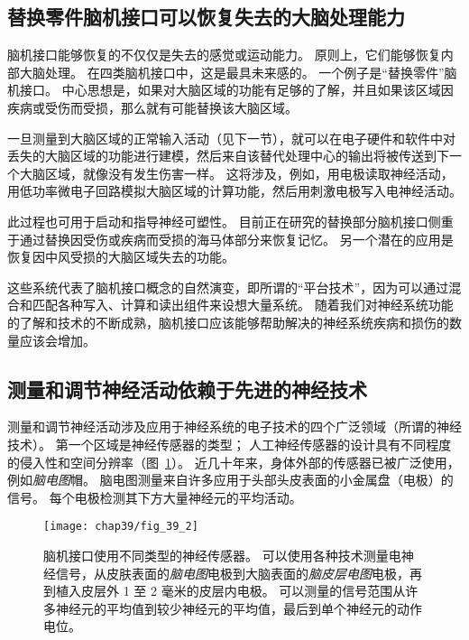 \subsection{替换零件脑机接口可以恢复失去的大脑处理能力}

脑机接口能够恢复的不仅仅是失去的感觉或运动能力。
原则上，它们能够恢复内部大脑处理。
在四类脑机接口中，这是最具未来感的。
一个例子是“替换零件”脑机接口。
中心思想是，如果对大脑区域的功能有足够的了解，并且如果该区域因疾病或受伤而受损，那么就有可能替换该大脑区域。


一旦测量到大脑区域的正常输入活动（见下一节），就可以在电子硬件和软件中对丢失的大脑区域的功能进行建模，然后来自该替代处理中心的输出将被传送到下一个大脑区域，就像没有发生伤害一样。
这将涉及，例如，用电极读取神经活动，用低功率微电子回路模拟大脑区域的计算功能，然后用刺激电极写入电神经活动。


此过程也可用于启动和指导神经可塑性。
目前正在研究的替换部分脑机接口侧重于通过替换因受伤或疾病而受损的海马体部分来恢复记忆。
另一个潜在的应用是恢复因中风受损的大脑区域失去的功能。


这些系统代表了脑机接口概念的自然演变，即所谓的“平台技术”，因为可以通过混合和匹配各种写入、计算和读出组件来设想大量系统。
随着我们对神经系统功能的了解和技术的不断成熟，脑机接口应该能够帮助解决的神经系统疾病和损伤的数量应该会增加。



\subsection{测量和调节神经活动依赖于先进的神经技术}

测量和调节神经活动涉及应用于神经系统的电子技术的四个广泛领域（所谓的神经技术）。
第一个区域是神经传感器的类型；
人工神经传感器的设计具有不同程度的侵入性和空间分辨率（图~\ref{fig:39_2}）。
近几十年来，身体外部的传感器已被广泛使用，例如\textit{脑电图}帽。
脑电图测量来自许多应用于头部头皮表面的小金属盘（电极）的信号。
每个电极检测其下方大量神经元的平均活动。


\begin{figure}[htbp]
	\centering
	\texttt{[image: chap39/fig\_39\_2]}
	\caption{脑机接口使用不同类型的神经传感器。 
		可以使用各种技术测量电神经信号，从皮肤表面的\textit{脑电图}电极到大脑表面的\textit{脑皮层电图}电极，再到植入皮层外 1 至 2 毫米的皮层内电极。 
		可以测量的信号范围从许多神经元的平均值到较少神经元的平均值，最后到单个神经元的动作电位\cite{blabe2015assessment}。}
	\label{fig:39_2}
\end{figure}


